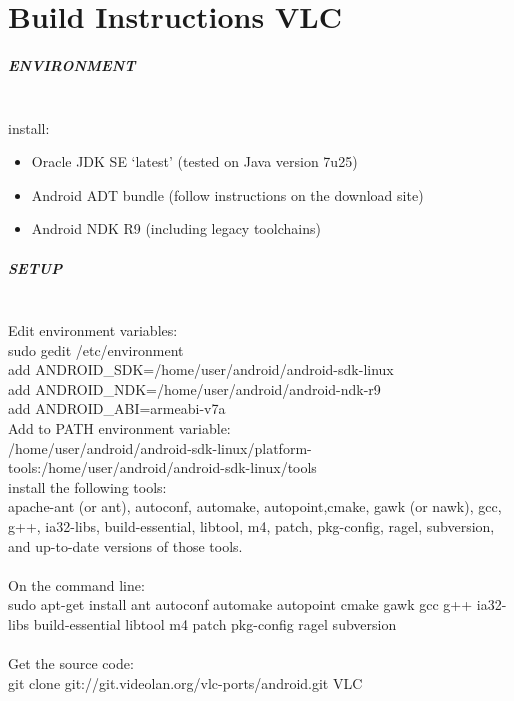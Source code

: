 \chapter{Build Instructions VLC}
\label{sec:app_vlc_build}
\paragraph{ENVIRONMENT} \mbox{}\\
install:
\begin{itemize}
\item Oracle JDK SE `latest' (tested on Java version 7u25)
\item Android ADT bundle (follow instructions on the download site)
\item Android NDK R9 (including legacy toolchains)
\end{itemize}

\paragraph{SETUP}\mbox{}\\
Edit environment variables:
\\
sudo gedit /etc/environment\\
add ANDROID\_SDK=/home/user/android/android-sdk-linux\\
add ANDROID\_NDK=/home/user/android/android-ndk-r9\\
add ANDROID\_ABI=armeabi-v7a\\

Add to PATH environment variable:\\
/home/user/android/android-sdk-linux/platform-tools:/home/user/android/android-sdk-linux/tools\\
install the following tools: \\
apache-ant (or ant), autoconf, automake, autopoint,cmake, gawk (or nawk), gcc, g++, ia32-libs, build-essential, libtool, m4, patch, pkg-config, ragel, subversion, and up-to-date versions of those tools.\\
\\
On the command line:\\
sudo apt-get install ant autoconf automake autopoint cmake gawk gcc g++ ia32-libs build-essential libtool m4 patch pkg-config ragel subversion\\
\\
Get the source code:\\
git clone git://git.videolan.org/vlc-ports/android.git VLC\\

